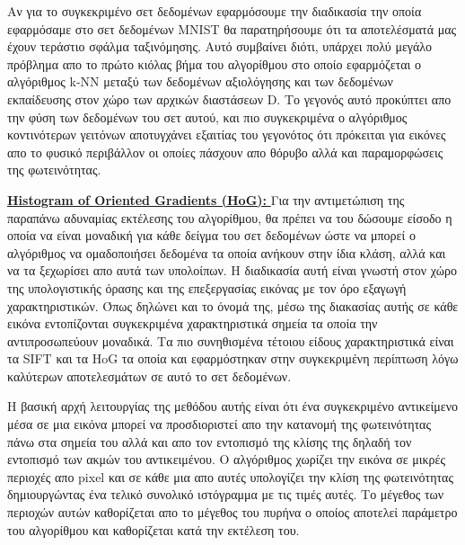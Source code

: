 \par
Αν για το συγκεκριμένο σετ δεδομένων εφαρμόσουμε την διαδικασία την οποία εφαρμόσαμε στο σετ δεδομένων \textlatin{MNIST} θα παρατηρήσουμε ότι τα αποτελέσματά μας έχουν τεράστιο σφάλμα ταξινόμησης. Αυτό συμβαίνει διότι, υπάρχει πολύ μεγάλο πρόβλημα απο το πρώτο κιόλας βήμα του αλγορίθμου στο οποίο εφαρμόζεται ο αλγόριθμος \textlatin{k-NN} μεταξύ των δεδομένων αξιολόγησης και των δεδομένων εκπαίδευσης στον χώρο των αρχικών διαστάσεων \textlatin{D}. Το γεγονός αυτό προκύπτει απο την φύση των δεδομένων του σετ αυτού, και πιο συγκεκριμένα ο αλγόριθμος κοντινότερων γειτόνων αποτυγχάνει εξαιτίας του γεγονότος ότι πρόκειται για εικόνες απο το φυσικό περιβάλλον οι οποίες πάσχουν απο θόρυβο αλλά και παραμορφώσεις της φωτεινότητας. 
\par
\href{https://en.wikipedia.org/wiki/Histogram_of_oriented_gradients}{\textbf{\textlatin{Histogram of Oriented Gradients (HoG): }}} Για την αντιμετώπιση της παραπάνω αδυναμίας εκτέλεσης του αλγορίθμου, θα πρέπει να του δώσουμε είσοδο η οποία να είναι μοναδική για κάθε δείγμα του σετ δεδομένων ώστε να μπορεί ο αλγόριθμος να ομαδοποιήσει δεδομένα τα οποία ανήκουν στην ίδια κλάση, αλλά και να τα ξεχωρίσει απο αυτά των υπολοίπων. Η διαδικασία αυτή είναι γνωστή στον χώρο της υπολογιστικής όρασης και της επεξεργασίας εικόνας με τον όρο εξαγωγή χαρακτηριστικών. Όπως δηλώνει και το όνομά της, μέσω της διακασίας αυτής σε κάθε εικόνα εντοπίζονται συγκεκριμένα χαρακτηριστικά σημεία τα οποία την αντιπροσωπεύουν μοναδικά. Τα πιο συνηθισμένα τέτοιου είδους χαρακτηριστικά είναι τα \textlatin{SIFT} και τα \textlatin{HoG} τα οποία και εφαρμόστηκαν στην συγκεκριμένη περίπτωση λόγω καλύτερων αποτελεσμάτων σε αυτό το σετ δεδομένων. 
\par
Η βασική αρχή λειτουργίας της μεθόδου αυτής είναι ότι ένα συγκεκριμένο αντικείμενο μέσα σε μια εικόνα μπορεί να προσδιοριστεί απο την κατανομή της φωτεινότητας πάνω στα σημεία του αλλά και απο τον εντοπισμό της κλίσης της δηλαδή τον εντοπισμό των ακμών του αντικειμένου. Ο αλγόριθμος χωρίζει την εικόνα σε μικρές περιοχές απο \textlatin{pixel} και σε κάθε μια απο αυτές υπολογίζει την κλίση της φωτεινότητας δημιουργώντας ένα τελικό συνολικό ιστόγραμμα με τις τιμές αυτές. Το μέγεθος των περιοχών αυτών καθορίζεται απο το μέγεθος του πυρήνα ο οποίος αποτελεί παράμετρο του αλγορίθμου και καθορίζεται κατά την εκτέλεση του.

